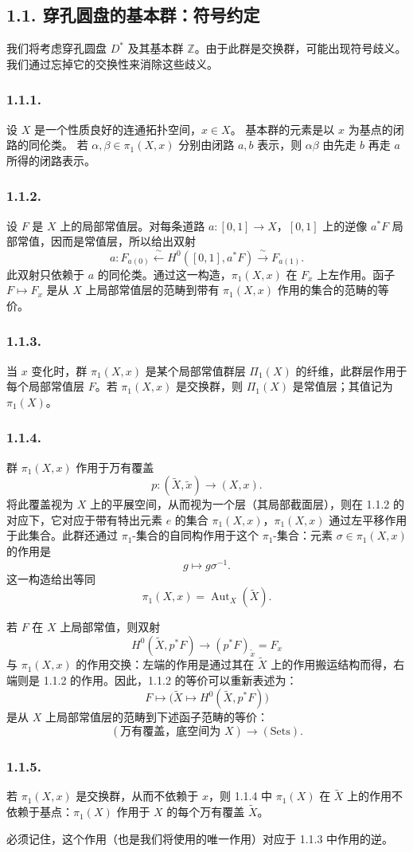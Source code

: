 \subsection*{1.1. 穿孔圆盘的基本群：符号约定}

我们将考虑穿孔圆盘 $D^*$ 及其基本群 $\mathbb Z$。由于此群是交换群，可能出现符号歧义。我们通过忘掉它的交换性来消除这些歧义。

\subsubsection*{1.1.1.}
设 $X$ 是一个性质良好的连通拓扑空间，$x\in X$。
基本群的元素是以 $x$ 为基点的闭路的同伦类。
若 $\alpha,\beta\in\pi_1(X,x)$ 分别由闭路 $a,b$ 表示，则 $\alpha\beta$ 由先走 $b$ 再走 $a$ 所得的闭路表示。

\subsubsection*{1.1.2.}
设 $F$ 是 $X$ 上的局部常值层。对每条道路 $a:[0,1]\longrightarrow X$，$[0,1]$ 上的逆像 $a^*F$ 局部常值，因而是常值层，所以给出双射
\[
a:F_{a(0)}
\xleftarrow{\ \sim\ }H^0([0,1],a^*F)
\xrightarrow{\ \sim\ }F_{a(1)}.
\]
此双射只依赖于 $a$ 的同伦类。通过这一构造，$\pi_1(X,x)$ 在 $F_x$ 上左作用。函子 $F\longmapsto F_x$ 是从 $X$ 上局部常值层的范畴到带有 $\pi_1(X,x)$ 作用的集合的范畴的等价。

\subsubsection*{1.1.3.}
当 $x$ 变化时，群 $\pi_1(X,x)$ 是某个局部常值群层 $\Pi_1(X)$ 的纤维，此群层作用于每个局部常值层 $F$。若 $\pi_1(X,x)$ 是交换群，则 $\Pi_1(X)$ 是常值层；其值记为 $\pi_1(X)$。

\subsubsection*{1.1.4.}
群 $\pi_1(X,x)$ 作用于万有覆盖
\[
p:(\widetilde X,\widetilde x)\longrightarrow(X,x).
\]
将此覆盖视为 $X$ 上的平展空间，从而视为一个层（其局部截面层），则在 1.1.2 的对应下，它对应于带有特出元素 $e$ 的集合 $\pi_1(X,x)$，$\pi_1(X,x)$ 通过左平移作用于此集合。此群还通过 $\pi_1$-集合的自同构作用于这个 $\pi_1$-集合：元素 $\sigma\in\pi_1(X,x)$ 的作用是
\[
g\longmapsto g\sigma^{-1}.
\]
这一构造给出等同
\[
\pi_1(X,x)=\operatorname{Aut}_X(\widetilde X).
\]

若 $F$ 在 $X$ 上局部常值，则双射
\begin{equation}\tag{1.1.4.1}
H^0(\widetilde X,p^*F)
\longrightarrow(p^*F)_{\widetilde x}=F_x
\end{equation}
与 $\pi_1(X,x)$ 的作用交换：左端的作用是通过其在 $\widetilde X$ 上的作用搬运结构而得，右端则是 1.1.2 的作用。因此，1.1.2 的等价可以重新表述为：
\[
F\longmapsto
\bigl(\widetilde X\longmapsto
H^0(\widetilde X,p^*F)\bigr)
\]
是从 $X$ 上局部常值层的范畴到下述函子范畴的等价：
\[
(\text{万有覆盖，底空间为 }X)\longrightarrow(\mathrm{Sets}).
\]

\subsubsection*{1.1.5.}
若 $\pi_1(X,x)$ 是交换群，从而不依赖于 $x$，则 1.1.4 中 $\pi_1(X)$ 在 $\widetilde X$ 上的作用不依赖于基点：$\pi_1(X)$ 作用于 $X$ 的每个万有覆盖 $\widetilde X$。

必须记住，这个作用（也是我们将使用的唯一作用）对应于 1.1.3 中作用的逆。
